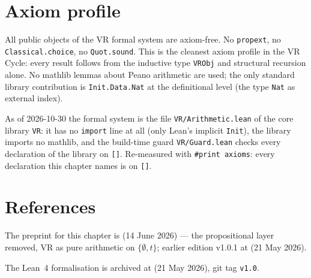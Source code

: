 \section{Axiom profile}
\label{sec:vr_axiom_profile}

\axiomprofile{[]}

All public objects of the VR formal system are axiom-free.  No
\texttt{propext}, no \texttt{Classical.choice}, no \texttt{Quot.sound}.
This is the cleanest axiom profile in the VR Cycle: every result follows
from the inductive type \texttt{VRObj} and structural recursion alone.
No mathlib lemmas about Peano arithmetic are used; the only standard
library contribution is \texttt{Init.Data.Nat} at the definitional level
(the type \texttt{Nat} as external index).

As of 2026-10-30 the formal system is the file \texttt{VR/Arithmetic.lean}
of the core library \texttt{VR}: it has no \texttt{import} line at all (only
Lean's implicit \texttt{Init}), the library imports no mathlib, and the
build-time guard \texttt{VR/Guard.lean} checks every declaration of the
library on \texttt{[]}.  Re-measured with \texttt{\#print axioms}: every
declaration this chapter names is on \texttt{[]}.

\section{References}
\label{sec:vr_refs}

The preprint for this chapter is
 (14 June
2026) --- the propositional layer removed, VR as pure arithmetic on
$\{\emptyset, t\}$; earlier edition v1.0.1 at
 (21 May 2026).

The Lean~4 formalisation is archived at
 (21 May 2026),
git tag \texttt{v1.0}.
